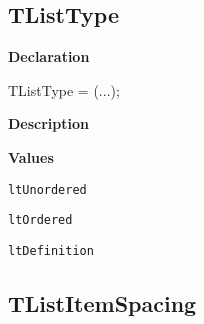 \documentclass{report}
\newif\ifpdf
\begin{document}
\subsection*{TListType}
\fi
\label{PasDoc_Gen-TListType}
\begin{list}{}{
\setlength{\itemindent}{0cm}
\setlength{\listparindent}{0cm}
\setlength{\leftmargin}{\evensidemargin}
\addtolength{\leftmargin}{\tmplength}
\settowidth{\labelsep}{X}
\addtolength{\leftmargin}{\labelsep}
\setlength{\labelwidth}{\tmplength}
}
\item[\textbf{Declaration}\hfill]
\ifpdf
\begin{flushleft}
\fi
\begin{ttfamily}
TListType = (...);\end{ttfamily}

\ifpdf
\end{flushleft}
\fi

\par
\item[\textbf{Description}]
 \item[\textbf{Values}]
\begin{description}
\item[\texttt{ltUnordered}] \label{PasDoc_Gen-ltUnordered}
\index{}
 
\item[\texttt{ltOrdered}] \label{PasDoc_Gen-ltOrdered}
\index{}
 
\item[\texttt{ltDefinition}] \label{PasDoc_Gen-ltDefinition}
\index{}
 
\end{description}


\end{list}
\ifpdf
\subsection*{\large{\textbf{TListItemSpacing}}\normalsize\hspace{1ex}\hrulefill}
\else
\end{document}
